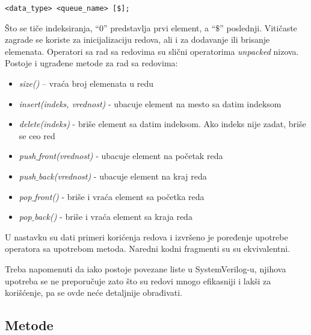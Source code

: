 \begin{lstlisting}
<data_type> <queue_name> [$];
\end{lstlisting}

Što se tiče indeksiranja, ``0'' predstavlja prvi element, a ``\(\$\)''
poslednji.
Vitičaste zagrade se koriste za inicijalizaciju redova, ali i za dodavanje ili
brisanje elemenata.
Operatori sa rad sa redovima su slični operatorima \emph{unpacked} nizova.\\

Postoje i ugrađene metode za rad sa redovima:

\begin{itemize}
\item \emph{size()} – vraća broj elemenata u redu
\item \emph{insert(indeks, vrednost)} - ubacuje element na mesto sa datim
  indeksom
\item \emph{delete(indeks)} - briše element sa datim indeksom. Ako indeks nije
  zadat, briše se ceo red
\item \emph{push\(\_\)front(vrednost)} - ubacuje element na početak reda
\item \emph{push\(\_\)back(vrednost)} - ubacuje element na kraj reda
\item \emph{pop\(\_\)front()} - briše i vraća element sa početka reda
\item \emph{pop\(\_\)back()} - briše i vraća element sa kraja reda
\end{itemize}

U nastavku su dati primeri korićenja redova i izvršeno je poređenje upotrebe
operatora sa upotrebom metoda. Naredni kodni fragmenti su su ekvivalentni.




Treba napomenuti da iako postoje povezane liste u SystemVerilog-u, njihova
upotreba se ne preporučuje zato što su redovi mnogo efikasniji i lakši za
korišćenje, pa se ovde neće detaljnije obrađivati.


\subsection{Metode}

